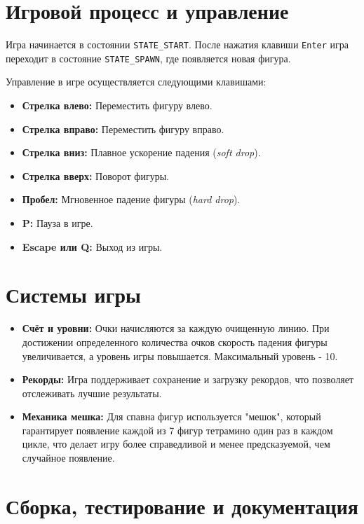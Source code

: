 \documentclass[12pt, a4paper]{article}
\begin{document}
\section{Игровой процесс и управление}

Игра начинается в состоянии \texttt{STATE\_START}. После нажатия клавиши \texttt{Enter} игра переходит в состояние \texttt{STATE\_SPAWN}, где появляется новая фигура.

Управление в игре осуществляется следующими клавишами:
\begin{itemize}
    \item \textbf{Стрелка влево:} Переместить фигуру влево.
    \item \textbf{Стрелка вправо:} Переместить фигуру вправо.
    \item \textbf{Стрелка вниз:} Плавное ускорение падения (\textit{soft drop}).
    \item \textbf{Стрелка вверх:} Поворот фигуры.
    \item \textbf{Пробел:} Мгновенное падение фигуры (\textit{hard drop}).
    \item \textbf{P:} Пауза в игре.
    \item \textbf{Escape или Q:} Выход из игры.
\end{itemize}

\section{Системы игры}

\begin{itemize}
    \item \textbf{Счёт и уровни:} Очки начисляются за каждую очищенную линию. При достижении определенного количества очков скорость падения фигуры увеличивается, а уровень игры повышается. Максимальный уровень - 10.
    \item \textbf{Рекорды:} Игра поддерживает сохранение и загрузку рекордов, что позволяет отслеживать лучшие результаты.
    \item \textbf{Механика мешка:} Для спавна фигур используется "мешок", который гарантирует появление каждой из 7 фигур тетрамино один раз в каждом цикле, что делает игру более справедливой и менее предсказуемой, чем случайное появление.
\end{itemize}

\section{Сборка, тестирование и документация}
\end{document}
